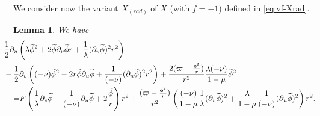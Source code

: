 \documentclass[10pt, reqno]{amsart}
\newtheorem{lemma}[theorem]{Lemma}
\theoremstyle{definition}
\theoremstyle{remark}
\theoremstyle{conjecture}
\numberwithin{equation}{section}
\newcommand{\rd}{\partial}
\newcommand{\0}{\emptyset}
\newcommand{\lmb}{\lambda}
\newcommand{\bfe}{{\bf e}}
\newcommand{\dur}{\nu}
\newcommand{\dvr}{\lmb}
\newcommand{\e}{\bfe}							%
\newcommand{\phibg}{\overline{\phi}}				%
\newcommand{\phidf}{\widetilde{\phi}}				%
\begin{document}
We consider now the variant $X_{(rad)}$ of $X$ (with $f = -1$) defined in \eqref{eq:vf-Xrad}.
\begin{lemma} \label{lem:morawetz-1}
We have
\begin{equation} \label{eq:en-id-Xrad}
\begin{aligned}
& \hskip-2em
	\frac{1}{2} \rd_{u} \left( \dvr \phidf^{2} + 2 \phidf \rd_{v} \phidf r + \frac{1}{\dvr} (\rd_{v} \phidf)^{2} r^{2} \right) \\
& \hskip-2em
	- \frac{1}{2} \rd_{v} \left( (-\dur) \phidf^{2} - 2 r \phidf \rd_{u} \phidf + \frac{1}{(-\dur)} (\rd_{u} \phidf)^{2} r^{2} \right) 
	+ \frac{2 (\varpi - \frac{\e^{2}}{r})}{r^{2}} \frac{\dvr (-\dur)}{1-\mu} \phidf^{2} \\
	= & F \left( \frac{1}{\dvr} \rd_{v} \phidf - \frac{1}{(-\dur)} \rd_{u} \phidf + 2 \frac{\phidf}{r} \right) r^{2} 
	 + \frac{(\varpi - \frac{\e^{2}}{r})}{r^{2}} \left( \frac{(-\dur)}{1-\mu} \frac{1}{\dvr} (\rd_{v} \phidf)^{2} + \frac{\dvr}{1-\mu} \frac{1}{(-\dur)} (\rd_{u} \phidf)^{2} \right) r^{2}.
\end{aligned}
\end{equation}
\end{lemma}
\end{document}
